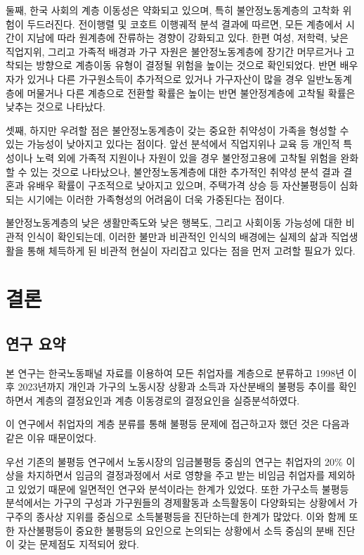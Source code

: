\documentclass[
  letterpaper,
  DIV=11,
  numbers=noendperiod]{scrartcl}
\begin{document}
둘째, 한국 사회의 계층 이동성은 약화되고 있으며, 특히 불안정노동계층의
고착화 위험이 두드러진다. 전이행렬 및 코호트 이행궤적 분석 결과에
따르면, 모든 계층에서 시간이 지남에 따라 원계층에 잔류하는 경향이
강화되고 있다. 한편 여성, 저학력, 낮은 직업지위, 그리고 가족적 배경과
가구 자원은 불안정노동계층에 장기간 머무르거나 고착되는 방향으로
계층이동 유형이 결정될 위험을 높이는 것으로 확인되었다. 반면 배우자가
있거나 다른 가구원소득이 추가적으로 있거나 가구자산이 많을 경우
일반노동계층에 머물거나 다른 계층으로 전환할 확률은 높이는 반면
불안정계층에 고착될 확률은 낮추는 것으로 나타났다.

셋째, 하지만 우려할 점은 불안정노동계층이 갖는 중요한 취약성이 가족을
형성할 수 있는 가능성이 낮아지고 있다는 점이다. 앞선 분석에서 직업지위나
교육 등 개인적 특성이나 노력 외에 가족적 지원이나 자원이 있을 경우
불안정고용에 고착될 위험을 완화할 수 있는 것으로 나타났으나,
불안정노동계층에 대한 추가적인 취약성 분석 결과 결혼과 유배우 확률이
구조적으로 낮아지고 있으며, 주택가격 상승 등 자산불평등이 심화되는
시기에는 이러한 가족형성의 어려움이 더욱 가중된다는 점이다.

불안정노동계층의 낮은 생활만족도와 낮은 행복도, 그리고 사회이동 가능성에
대한 비관적 인식이 확인되는데, 이러한 불만과 비관적인 인식의 배경에는
실제의 삶과 직업생활을 통해 체득하게 된 비관적 현실이 자리잡고 있다는
점을 먼저 고려할 필요가 있다.

\section{결론}\label{uxacb0uxb860}

\subsection{연구 요약}\label{uxc5f0uxad6c-uxc694uxc57d}

본 연구는 한국노동패널 자료를 이용하여 모든 취업자를 계층으로 분류하고
1998년 이후 2023년까지 개인과 가구의 노동시장 상황과 소득과 자산분배의
불평등 추이를 확인하면서 계층의 결정요인과 계층 이동경로의 결정요인을
실증분석하였다.

이 연구에서 취업자의 계층 분류를 통해 불평등 문제에 접근하고자 했던 것은
다음과 같은 이유 때문이었다.

우선 기존의 불평등 연구에서 노동시장의 임금불평등 중심의 연구는 취업자의
20\% 이상을 차지하면서 임금의 결정과정에서 서로 영향을 주고 받는 비임금
취업자를 제외하고 있었기 때문에 일면적인 연구와 분석이라는 한계가
있었다. 또한 가구소득 불평등 분석에서는 가구의 구성과 가구원들의
경제활동과 소득활동이 다양화되는 상황에서 가구주의 종사상 지위를
중심으로 소득불평등을 진단하는데 한계가 많았다. 이와 함께 또한
자산불평등이 중요한 불평등의 요인으로 논의되는 상황에서 소득 중심의 분배
진단이 갖는 문제점도 지적되어 왔다.
\end{document}
